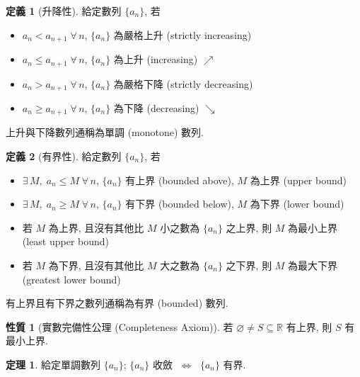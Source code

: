 \documentclass[12pt]{extarticle}
\newcommand{\ifff}{\;\Longleftrightarrow\;}
\theoremstyle{definition}
\newtheorem*{dfn}{定義}
\newtheorem*{prp}{性質}
\newtheorem*{thm}{定理}
\begin{document}
\begin{dfn}[升降性]
  給定數列 $\{a_n\}$, 若 
  \begin{itemize}\setlength{\itemsep}{0pt}
    \item $a_n < a_{n + 1}\;\forall\,n$, $\{a_n\}$ 為嚴格上升 (strictly increasing)  
    \item $a_n\leqslant a_{n + 1}\;\forall\,n$, $\{a_n\}$ 為上升 (increasing) $\nearrow$ 
    \item $a_n > a_{n + 1}\;\forall\,n$, $\{a_n\}$ 為嚴格下降 (strictly decreasing)   
    \item $a_n\geqslant a_{n + 1}\;\forall\,n$, $\{a_n\}$ 為下降 (decreasing) $\searrow$
  \end{itemize}
  上升與下降數列通稱為單調 (monotone) 數列. 
\end{dfn}

\begin{dfn}[有界性]
  給定數列 $\{a_n\}$, 若 
  \begin{itemize}\setlength{\itemsep}{0pt}
    \item $\exists\,M,\;a_n \leqslant M\;\forall\,n$, $\{a_n\}$ 有上界 (bounded above), $M$ 為上界 (upper bound)  
    \item $\exists\,M,\;a_n \geqslant M\;\forall\,n$, $\{a_n\}$ 有下界 (bounded below), $M$ 為下界 (lower bound)  
    \item 若 $M$ 為上界, 且沒有其他比 $M$ 小之數為 $\{a_n\}$ 之上界, 則 $M$ 為最小上界 (least upper bound)  
    \item 若 $M$ 為下界, 且沒有其他比 $M$ 大之數為 $\{a_n\}$ 之下界, 則 $M$ 為最大下界 (greatest lower bound)  
  \end{itemize}
  有上界且有下界之數列通稱為有界 (bounded) 數列. 
\end{dfn}

\begin{prp}[實數完備性公理 (Completeness Axiom)]
  若 $\varnothing\ne S\subseteq\mathbb{R}$ 有上界, 則 $S$ 有最小上界.  
\end{prp}

\begin{thm}
  給定單調數列 $\{a_n\}$; $\{a_n\}$ 收斂 $\ifff$ $\{a_n\}$ 有界.  
\end{thm}
\end{document}

